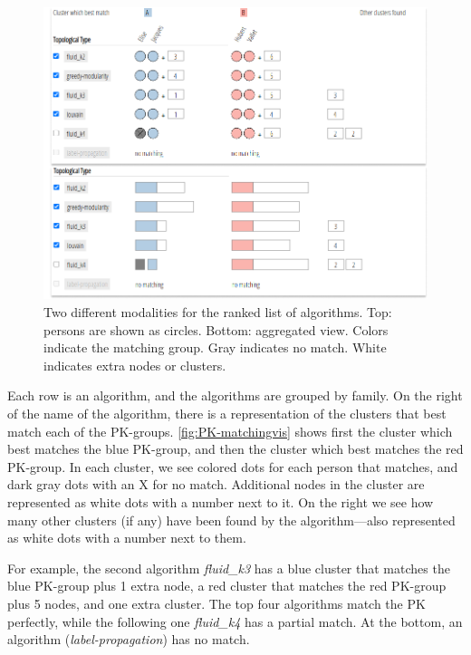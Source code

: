 \begin{figure}[!ht]
\centering
\includegraphics[width=\linewidth]{static/figures/PK-Clustering/VISPaperFigures/matchingExampleFinal.png}
\caption{Two different modalities for the ranked list of algorithms. Top: persons are shown as circles. Bottom: aggregated view. Colors indicate the matching group. Gray indicates no match. White indicates extra nodes or clusters.}
\label{fig:PK-matchingvis}
\end{figure}

Each row is an algorithm, and the algorithms are grouped by family. On the right of the name of the algorithm, there is a representation of the clusters that best match each of the PK-groups. \autoref{fig:PK-matchingvis} shows first the cluster which best matches the blue PK-group, and then the cluster which best matches the red PK-group. In each cluster, we see colored dots for each person that matches, and dark gray dots with an X for no match. Additional nodes in the cluster are represented as white dots with a number next to it.  On the right we see how many other clusters (if any) have been found by the algorithm---also represented as white dots with a number next to them.

For example, the second algorithm \emph{fluid\_k3} has a blue cluster that matches the blue PK-group plus 1 extra node, a red cluster that matches the red PK-group plus 5 nodes, and one extra cluster.
The top four algorithms match the PK perfectly, while the following one \emph{fluid\_k4} has a partial match. At the bottom, an algorithm (\emph{label-propagation}) has no match.

